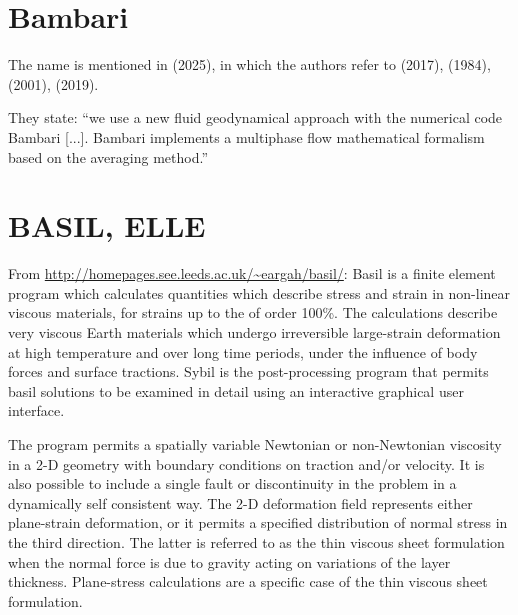 \section{Bambari} 

The name is mentioned in \textcite{bobs25} (2025),
in which the authors refer to \textcite{bori17} (2017),
\cite{mcke84} (1984), \cite{bers01} (2001), \cite{kesu19} (2019).

They state: ``we use a new fluid geodynamical
approach with the numerical code Bambari [...]. 
Bambari implements a multiphase
flow mathematical formalism based on the averaging method.''




\section{BASIL, ELLE} 

From \url{http://homepages.see.leeds.ac.uk/~eargah/basil/}:
Basil is a finite element program which calculates quantities which describe  stress 
and strain in non-linear viscous materials, for strains up to the of order 100\%.   
The calculations  describe  very  viscous  Earth materials which undergo irreversible large-strain 
deformation at  high  temperature  and over long time periods, under the influence of body 
forces and surface tractions.  Sybil  is the post-processing program that permits basil 
solutions to be examined in detail using an interactive graphical user interface.

The program permits a spatially variable Newtonian  or  non-Newtonian  viscosity  in a 2-D 
geometry with boundary conditions on traction and/or velocity.  It is also  possible  
to include  a single fault or discontinuity in the problem in a dynamically self consistent way.  
The 2-D deformation  field represents  either plane-strain deformation, or it permits 
a specified distribution of normal stress in the third  direction.   The  latter is referred 
to as the thin viscous sheet formulation when the normal force is due to  gravity  acting on 
variations of the layer thickness.  Plane-stress calculations are a specific case of 
the thin viscous sheet formulation.

